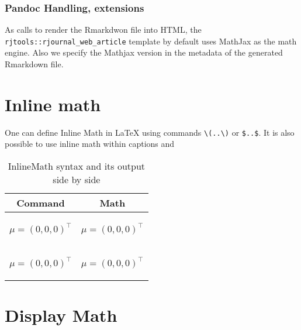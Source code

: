 \subsubsection{Pandoc Handling, extensions}
As  calls  to render the Rmarkdwon file into HTML,
the \verb|rjtools::rjournal_web_article| template by default uses MathJax as the math engine. 
Also we specify the Mathjax version in the metadata of the generated Rmarkdown file.

\section{Inline math}
One can define Inline Math in LaTeX using commands \verb|\(..\)| or \verb|$..$|.
It is also possible to use inline math within captions and  
\begin{table}[htbp]
  \centering
  \begin{tabular}{| c | c |}
  \hline
  Command & Math\\
    \hline
    \begin{minipage}{0.45\textwidth}
\vspace{1mm}
\begin{example}
\(\mu = (0,0,0)^\top \)
\end{example}
    \end{minipage} &
    \begin{minipage}{0.45\textwidth}
    \centering
    \( \mu = (0,0,0)^\top \)
    \end{minipage}\\
    \hline
    
  \begin{minipage}{0.45\textwidth}
\vspace{1mm}
\begin{example}
$\mu = (0,0,0)^\top $
\end{example}
    \end{minipage} &
    \begin{minipage}{0.45\textwidth}
    \centering
    $ \mu = (0,0,0)^\top $
    \end{minipage}\\
    \hline
  \end{tabular}
  \caption{InlineMath syntax and its output side by side}
  \label{table:1}
\end{table}



\section{Display Math}



